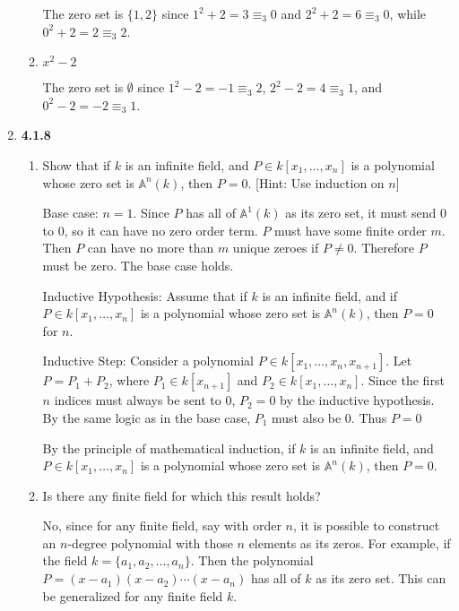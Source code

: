 \documentclass[12pt]{article}
\newcommand{\A}{\mathbb{A}}
\begin{document}
\begin{enumerate}
\begin{enumerate}
The zero set is $\{1,2\}$ since $1^2+2=3 \equiv_3 0$ and $2^2+2=6 \equiv_3 0$, while $0^2+2=2 \equiv_3 2$.

\item $x^2-2$

The zero set is $\emptyset$ since  $1^2-2=-1 \equiv_3 2$, $2^2-2=4 \equiv_3 1$, and $0^2-2=-2 \equiv_3 1$.
    
    \end{enumerate}
    
    \item \textbf{4.1.8} 
    \begin{enumerate}
    
    \item Show that if $k$ is an infinite field, and $P\in k[x_1, \dots, x_n]$ is a polynomial whose zero set is $\A^n(k)$, then $P=0$.  [Hint: Use induction on $n$]
    
    Base case: $n=1$.  Since $P$ has all of $\A^1(k)$ as its zero set, it must send $0$ to $0$, so it can have no zero order term.  $P$ must have some finite order $m$.  Then $P$ can have no more than $m$ unique zeroes if $P\neq 0$.  Therefore $P$ must be zero.  The base case holds.
    
    Inductive Hypothesis: Assume that if $k$ is an infinite field, and if $P\in k[x_1, \dots, x_n]$ is a polynomial whose zero set is $\A^n(k)$, then $P=0$ for $n$.
    
    Inductive Step: Consider a polynomial $P\in k[x_1, \dots, x_n, x_{n+1}]$.  Let $P=P_1+P_2$, where $P_1\in k[x_{n+1}]$ and $P_2\in k[x_1, \dots, x_n]$.  Since the first $n$ indices must always be sent to $0$, $P_2=0$ by the inductive hypothesis.  By the same logic as in the base case, $P_1$ must also be 0.  Thus $P=0$
    
    By the principle of mathematical induction, if $k$ is an infinite field, and $P\in k[x_1, \dots, x_n]$ is a polynomial whose zero set is $\A^n(k)$, then $P=0$.
    
    \item Is there any finite field for which this result holds?
    
    No, since for any finite field, say with order $n$, it is possible to construct an $n$-degree polynomial with those $n$ elements as its zeros.  For example, if the field $k=\{a_1, a_2, \dots, a_n\}$.  Then the polynomial $P=(x-a_1)(x-a_2)\cdots(x-a_n)$ has all of $k$ as its zero set.  This can be generalized for any finite field $k$.
    
    \end{enumerate}


\end{enumerate}
\end{document}

